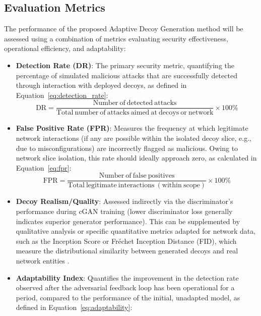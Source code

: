 \documentclass{article}
\begin{document}
\subsection{Evaluation Metrics}
The performance of the proposed Adaptive Decoy Generation method will be assessed using a combination of metrics evaluating security effectiveness, operational efficiency, and adaptability:
\begin{itemize}[label=\textbf{\textbullet}]
    \item \textbf{Detection Rate (DR)}: The primary security metric, quantifying the percentage of simulated malicious attacks that are successfully detected through interaction with deployed decoys, as defined in Equation~\eqref{eq:detection_rate}:
    \begin{equation}
    \label{eq:detection_rate}
    \mathrm{DR} = \frac{\mathrm{Number\ of\ detected\ attacks}}{\mathrm{Total\ number\ of\ attacks\ aimed\ at\ decoys\ or\ network}} \times 100\%
    \end{equation}
    \item \textbf{False Positive Rate (FPR)}: Measures the frequency at which legitimate network interactions (if any are possible within the isolated decoy slice, e.g., due to misconfigurations) are incorrectly flagged as malicious. Owing to network slice isolation, this rate should ideally approach zero, as calculated in Equation~\eqref{eq:fpr}:
    \begin{equation}
    \label{eq:fpr}
    \mathrm{FPR} = \frac{\mathrm{Number\ of\ false\ positives}}{\mathrm{Total\ legitimate\ interactions\ (within\ scope)} } \times 100\%
    \end{equation}
    \item \textbf{Decoy Realism/Quality}: Assessed indirectly via the discriminator's performance during cGAN training (lower discriminator loss generally indicates superior generator performance). This can be supplemented by qualitative analysis or specific quantitative metrics adapted for network data, such as the Inception Score or Fr\'{e}chet Inception Distance (FID), which measure the distributional similarity between generated decoys and real network entities \cite{Ayanoglu2022MachineLIA}.
    \item \textbf{Adaptability Index}: Quantifies the improvement in the detection rate observed after the adversarial feedback loop has been operational for a period, compared to the performance of the initial, unadapted model, as defined in Equation~\eqref{eq:adaptability}:
    \begin{equation}

\end{equation}
\end{itemize}
\end{document}
